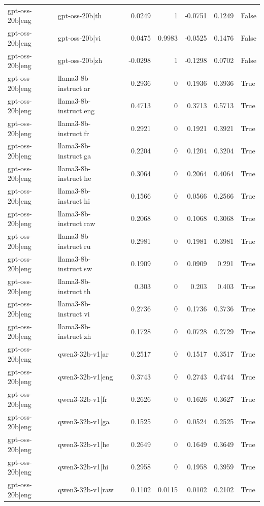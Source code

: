 \begin{table}
\begin{tabular}{l l r r r r l}
gpt-oss-20b|eng & gpt-oss-20b|th & 0.0249 & 1 & -0.0751 & 0.1249 & False \\
gpt-oss-20b|eng & gpt-oss-20b|vi & 0.0475 & 0.9983 & -0.0525 & 0.1476 & False \\
gpt-oss-20b|eng & gpt-oss-20b|zh & -0.0298 & 1 & -0.1298 & 0.0702 & False \\
gpt-oss-20b|eng & llama3-8b-instruct|ar & 0.2936 & 0 & 0.1936 & 0.3936 & True \\
gpt-oss-20b|eng & llama3-8b-instruct|eng & 0.4713 & 0 & 0.3713 & 0.5713 & True \\
gpt-oss-20b|eng & llama3-8b-instruct|fr & 0.2921 & 0 & 0.1921 & 0.3921 & True \\
gpt-oss-20b|eng & llama3-8b-instruct|ga & 0.2204 & 0 & 0.1204 & 0.3204 & True \\
gpt-oss-20b|eng & llama3-8b-instruct|he & 0.3064 & 0 & 0.2064 & 0.4064 & True \\
gpt-oss-20b|eng & llama3-8b-instruct|hi & 0.1566 & 0 & 0.0566 & 0.2566 & True \\
gpt-oss-20b|eng & llama3-8b-instruct|raw & 0.2068 & 0 & 0.1068 & 0.3068 & True \\
gpt-oss-20b|eng & llama3-8b-instruct|ru & 0.2981 & 0 & 0.1981 & 0.3981 & True \\
gpt-oss-20b|eng & llama3-8b-instruct|sw & 0.1909 & 0 & 0.0909 & 0.291 & True \\
gpt-oss-20b|eng & llama3-8b-instruct|th & 0.303 & 0 & 0.203 & 0.403 & True \\
gpt-oss-20b|eng & llama3-8b-instruct|vi & 0.2736 & 0 & 0.1736 & 0.3736 & True \\
gpt-oss-20b|eng & llama3-8b-instruct|zh & 0.1728 & 0 & 0.0728 & 0.2729 & True \\
gpt-oss-20b|eng & qwen3-32b-v1|ar & 0.2517 & 0 & 0.1517 & 0.3517 & True \\
gpt-oss-20b|eng & qwen3-32b-v1|eng & 0.3743 & 0 & 0.2743 & 0.4744 & True \\
gpt-oss-20b|eng & qwen3-32b-v1|fr & 0.2626 & 0 & 0.1626 & 0.3627 & True \\
gpt-oss-20b|eng & qwen3-32b-v1|ga & 0.1525 & 0 & 0.0524 & 0.2525 & True \\
gpt-oss-20b|eng & qwen3-32b-v1|he & 0.2649 & 0 & 0.1649 & 0.3649 & True \\
gpt-oss-20b|eng & qwen3-32b-v1|hi & 0.2958 & 0 & 0.1958 & 0.3959 & True \\
gpt-oss-20b|eng & qwen3-32b-v1|raw & 0.1102 & 0.0115 & 0.0102 & 0.2102 & True \\

\end{tabular}
\end{table}
